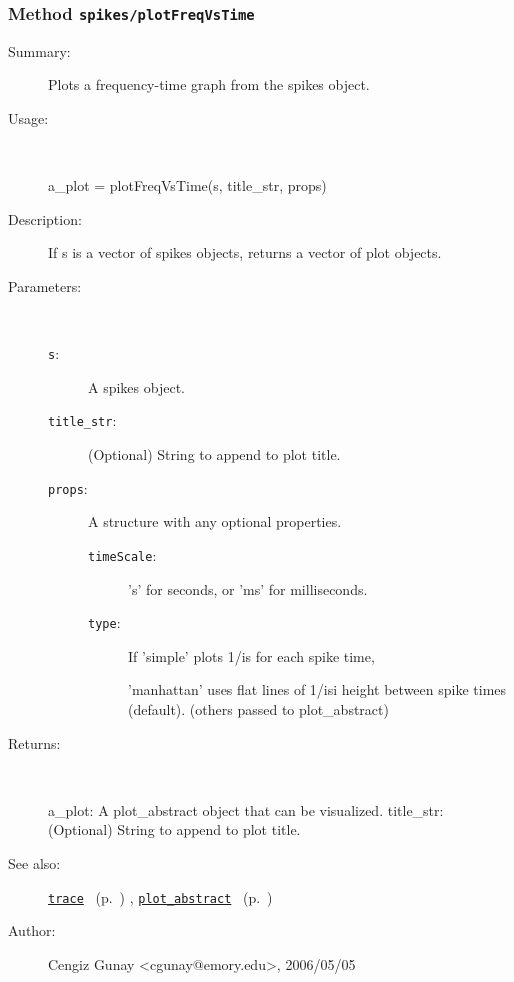 \subsubsection[Method \texttt{plotFreqVsTime}]{Method \texttt{spikes/plotFreqVsTime}}%
%
\label{ref_spikes__plotFreqVsTime}%
\hypertarget{ref_spikes__plotFreqVsTime}{}%
\begin{description}
\item[Summary:]Plots a frequency-time graph from the spikes object.
%
\item[Usage:]~%
\begin{lyxcode}%
a\_plot = plotFreqVsTime(s, title\_str, props)
%
\end{lyxcode}%
%
\item[Description:]%
If s is a vector of spikes objects, returns a vector of plot objects.
\item[Parameters:]~
\begin{description}%
\item[\texttt{s}:]
 A spikes object.
\item[\texttt{title\_str}:]
 (Optional) String to append to plot title.
\item[\texttt{props}:]
 A structure with any optional properties.
\begin{description}%
\item[\texttt{timeScale}:]
 's' for seconds, or 'ms' for milliseconds.
\item[\texttt{type}:]
 If 'simple' plots 1/is for each spike time, 

'manhattan' uses flat lines of 1/isi height between spike times (default).
(others passed to plot\_abstract)
\end{description}%
\end{description}%
%
\item[Returns:
]~

	a\_plot: A plot\_abstract object that can be visualized.
	title\_str: (Optional) String to append to plot title.
%
%
\item[See also:]%
\hyperlink{ref_trace}{\texttt{trace}}%
\ (p.~\pageref{ref_trace})%
%
, \hyperlink{ref_plot_abstract}{\texttt{plot\_abstract}}%
\ (p.~\pageref{ref_plot_abstract})%
%
%
\item[Author:]%
Cengiz Gunay <cgunay@emory.edu>, 2006/05/05
%
\end{description}
\methodline%
